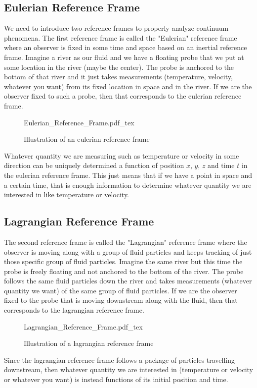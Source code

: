 \subsection{Eulerian Reference Frame}
\begin{comment}
\end{comment}
We need to introduce two reference frames to properly analyze continuum phenomena. 
The first reference frame is called the "Eulerian" reference frame where an observer is fixed in some time and space based on an inertial reference frame.
Imagine a river as our fluid and we have a floating probe that we put at some location in the river (maybe the center).
The probe is anchored to the bottom of that river and it just takes measurements (temperature, velocity, whatever you want) from its fixed location in space and in the river.
If we are the observer fixed to such a probe, then that corresponds to the eulerian reference frame.
\begin{figure}[H]\centering
\def\svgwidth{500px}
{Eulerian_Reference_Frame.pdf_tex}
\caption{Illustration of an eulerian reference frame}
\label{eulerian reference frame fluid}
\end{figure}
Whatever quantity we are measuring such as temperature or velocity in some direction can be uniquely determined a function of position $x$, $y$, $z$ and time $t$ in the eulerian reference frame.
This just means that if we have a point in space and a certain time, that is enough information to determine whatever quantity we are interested in like temperature or velocity.


\subsection{Lagrangian Reference Frame}
\begin{comment}
\end{comment}
The second reference frame is called the "Lagrangian" reference frame where the observer is moving along with a group of fluid particles and keeps tracking of just those specific group of fluid particles.
Imagine the same river but this time the probe is freely floating and not anchored to the bottom of the river.
The probe follows the same fluid particles down the river and takes measurements (whatever quantity we want) of the same group of fluid particles.
If we are the observer fixed to the probe that is moving downstream along with the fluid, then that corresponds to the lagrangian reference frame.
\begin{figure}[H]\centering
\def\svgwidth{500px}
{Lagrangian_Reference_Frame.pdf_tex}
\caption{Illustration of a lagrangian reference frame}
\label{lagrangian reference frame fluid}
\end{figure}
Since the lagrangian reference frame follows a package of particles travelling downstream, then whatever quantity we are interested in (temperature or velocity or whatever you want) is instead functions of its initial position and time. 


